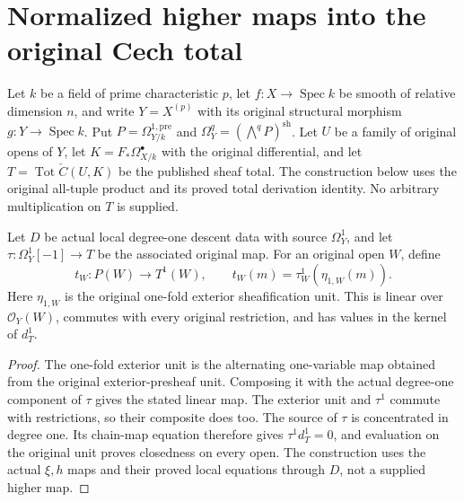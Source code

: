 \section{Normalized higher maps into the original Cech total}

Let $k$ be a field of prime characteristic $p$, let $f:X\to\operatorname{Spec}k$
be smooth of relative dimension $n$, and write $Y=X^{(p)}$ with its original
structural morphism $g:Y\to\operatorname{Spec}k$. Put
$P=\Omega^{1,\mathrm{pre}}_{Y/k}$ and
$\Omega_Y^q=(\bigwedge^q P)^{\mathrm{sh}}$. Let $U$ be a family of original
opens of $Y$, let $K=F_*\Omega^\bullet_{X/k}$ with the original differential,
and let $T=\operatorname{Tot}\check C(U,K)$ be the published sheaf total.
The construction below uses the original all-tuple product and its proved
total derivation identity. No arbitrary multiplication on $T$ is supplied.

\begin{definition}
\label{def:di-higher-exterior-raw-one}
\leanok
{}
Let $D$ be actual local degree-one descent data with source $\Omega_Y^1$,
and let $\tau:\Omega_Y^1[-1]\to T$ be the associated original map.
For an original open $W$, define
\[
 t_W:P(W)\longrightarrow T^1(W),\qquad
 t_W(m)=\tau^1_W(\eta_{1,W}(m)).
\]
Here $\eta_{1,W}$ is the original one-fold exterior sheafification unit.
This is linear over $\mathcal O_Y(W)$, commutes with every original
restriction, and has values in the kernel of $d_T^1$.
\end{definition}
\begin{proof}
\leanok
The one-fold exterior unit is the alternating one-variable map obtained
from the original exterior-presheaf unit. Composing it with the actual
degree-one component of $\tau$ gives the stated linear map. The exterior
unit and $\tau^1$ commute with restrictions, so their composite does too.
The source of $\tau$ is concentrated in degree one. Its chain-map equation
therefore gives $\tau^1d_T^1=0$, and evaluation on the original unit proves
closedness on every open. The construction uses the actual $\xi,h$ maps
and their proved local equations through $D$, not a supplied higher map.
\end{proof}

